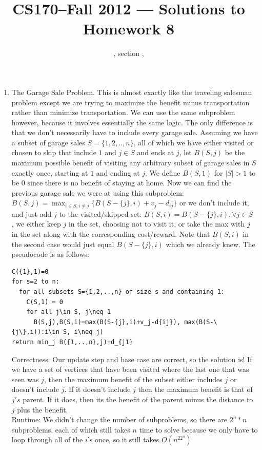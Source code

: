 \documentclass[11pt]{article}
\title{CS170--Fall 2012 --- Solutions to Homework 8}
\author{\Name, section \Sec, \texttt{\Login}}
\begin{document}
\maketitle
\begin{enumerate}
\item The Garage Sale Problem. This is almost exactly like the traveling salesman problem except we are trying to maximize the benefit minus transportation rather than minimize transportation. We can use the same subproblem however, because it involves essentially the same logic. The only difference is that we don't necessarily have to include every garage sale. Assuming we have a subset of garage sales $S=\{1,2,..,n\}$, all of which we have either visited or chosen to skip that include $1$ and $j\in S$ and ends at $j$, let $B(S,j)$ be the maximum possible benefit of visiting any arbitrary subset of garage sales in $S$ exactly once, starting at $1$ and ending at $j$. We define $B(S,1)$ for $|S|>1$ to be $0$ since there is no benefit of staying at home. Now we can find the previous garage sale we were at using this subproblem: $B(S,j)=\max_{i\in S, i\neq j} \{B(S-\{j\},i)+v_j-d_{ij}\}$ or we don't include it, and just add $j$ to the visited/skipped set: $B(S,i)=B(S-\{j\},i),\forall j\in S$\\, 
we either keep $j$ in the set, choosing not to visit it, or take the max with $j$ in the set along with the corresponding cost/reward. Note that $B(S,i)$ in the second case would just equal $B(S-\{j\},i)$ which we already knew.
The pseudocode is as follows:\\
\begin{verbatim}
C({1},1)=0
for s=2 to n:
  for all subsets S={1,2,..,n} of size s and containing 1:
    C(S,1) = 0
    for all j\in S, j\neq 1
      B(S,j),B(S,i)=max(B(S-{j},i)+v_j-d{ij}), max(B(S-\{j\},i)):i\in S, i\neq j)
return min_j B({1,..,n},j)+d_{j1}
\end{verbatim}
Correctness: Our update step and base case are correct, so the solution is! If we have a set of vertices that have been visited where the last one that was seen was $j$, then the maximum benefit of the subset either includes $j$ or doesn't include $j$. If it doesn't include $j$ then the maximum benefit is that of $j's$ parent. If it does, then its the benefit of the parent minus the distance to $j$ plus the benefit.\\
Runtime: We didn't change the number of subproblems, so there are $2^n*n$ subproblems, each of which still takes $n$ time to solve because we only have to loop through all of the $i$'s once, so it still takes $O(n^22^n)$ 

\end{enumerate}
\end{document}
